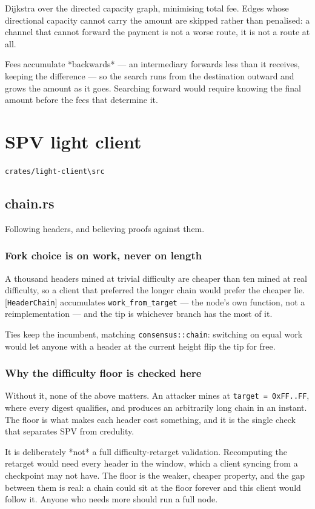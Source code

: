 \documentclass[11pt,a4paper]{article}
\begin{document}
Dijkstra over the directed capacity graph, minimising total fee. Edges whose
directional capacity cannot carry the amount are skipped rather than
penalised: a channel that cannot forward the payment is not a worse route, it
is not a route at all.

Fees accumulate *backwards* — an intermediary forwards less than it receives,
keeping the difference — so the search runs from the destination outward and
grows the amount as it goes. Searching forward would require knowing the
final amount before the fees that determine it.

\section{SPV light client}
\noindent\texttt{crates/light-client\textbackslash{}src}

\subsection{chain.rs}
Following headers, and believing proofs against them.

\subsubsection{Fork choice is on work, never on length}

A thousand headers mined at trivial difficulty are cheaper than ten mined at
real difficulty, so a client that preferred the longer chain would prefer the
cheaper lie. [\texttt{HeaderChain}] accumulates \texttt{work\_from\_target} — the node's own
function, not a reimplementation — and the tip is whichever branch has the
most of it.

Ties keep the incumbent, matching \texttt{consensus::chain}: switching on equal work
would let anyone with a header at the current height flip the tip for free.

\subsubsection{Why the difficulty floor is checked here}

Without it, none of the above matters. An attacker mines at
\texttt{target = 0xFF..FF}, where every digest qualifies, and produces an arbitrarily
long chain in an instant. The floor is what makes each header cost something,
and it is the single check that separates SPV from credulity.

It is deliberately *not* a full difficulty-retarget validation. Recomputing
the retarget would need every header in the window, which a client syncing
from a checkpoint may not have. The floor is the weaker, cheaper property,
and the gap between them is real: a chain could sit at the floor forever and
this client would follow it. Anyone who needs more should run a full node.
\end{document}
